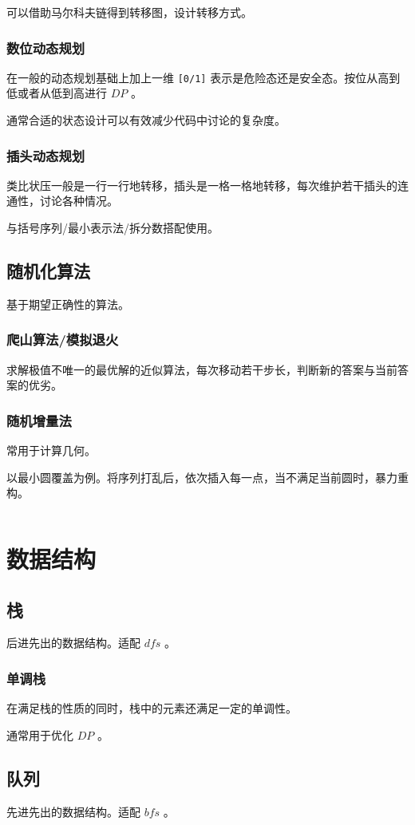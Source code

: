 \documentclass[UTF-8]{ctexart}
\newcommand{\cpp}[1]{\inputminted[bgcolor=bg,breaklines,breakanywhere=true]{c++}{#1}}
\begin{document}
			可以借助马尔科夫链得到转移图，设计转移方式。
			\subsubsection{数位动态规划}
			在一般的动态规划基础上加上一维 \texttt{[0/1]} 表示是危险态还是安全态。按位从高到低或者从低到高进行 $DP$ 。
	
			通常合适的状态设计可以有效减少代码中讨论的复杂度。
			\subsubsection{插头动态规划}
			类比状压一般是一行一行地转移，插头是一格一格地转移，每次维护若干插头的连通性，讨论各种情况。
	
			与括号序列/最小表示法/拆分数搭配使用。
		\subsection{随机化算法}
		基于期望正确性的算法。
			\subsubsection{爬山算法/模拟退火}
			求解极值不唯一的最优解的近似算法，每次移动若干步长，判断新的答案与当前答案的优劣。
			\subsubsection{随机增量法}
			常用于计算几何。
	
			以最小圆覆盖为例。将序列打乱后，依次插入每一点，当不满足当前圆时，暴力重构。
			\cpp{code//Example//BZOJ1337.cpp}
	\section{数据结构}
		\subsection{栈}
		后进先出的数据结构。适配 $dfs$ 。
			\subsubsection{单调栈}
			在满足栈的性质的同时，栈中的元素还满足一定的单调性。
		
			通常用于优化 $DP$ 。
		\subsection{队列}
		先进先出的数据结构。适配 $bfs$ 。
\end{document}
